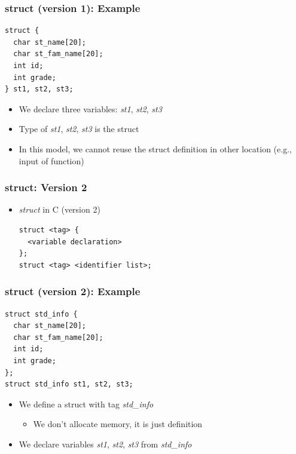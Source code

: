 \documentclass{../c-lecture}
\begin{document}
\begin{frame}[fragile]
  \frametitle{struct (version 1): Example}
  \begin{verbatim}
struct {
  char st_name[20];
  char st_fam_name[20];
  int id;
  int grade;
} st1, st2, st3;
  \end{verbatim}
  \begin{itemize}
    \item
      We declare three variables: \textit{\color{YellowOrange} st1},
      \textit{\color{YellowOrange} st2},
      \textit{\color{YellowOrange} st3}
    \item
      Type of \textit{\color{YellowOrange}st1},
      \textit{\color{YellowOrange} st2}, \textit{\color{YellowOrange} st3} is
      the struct
    \item
      In this model, we cannot reuse the struct definition in other location
      (e.g., input of function)
  \end{itemize}
\end{frame}

\begin{frame}[fragile]
  \frametitle{struct: Version 2}
  \begin{itemize}
    \item \textit{\color{Cyan} struct} in C (version 2)
    \begin{verbatim}
struct <tag> {
  <variable declaration>
};
struct <tag> <identifier list>;
    \end{verbatim}
  \end{itemize}
\end{frame}

\begin{frame}[fragile]
  \frametitle{struct (version 2): Example}
  \begin{verbatim}
struct std_info {
  char st_name[20];
  char st_fam_name[20];
  int id;
  int grade;
};
struct std_info st1, st2, st3;
  \end{verbatim}
  \begin{itemize}
    \item We define a struct with tag \textit{\color{YellowOrange} std\_info}
    \begin{itemize}
      \item We don’t allocate memory, it is just definition
    \end{itemize}
    \item
      We declare variables \textit{\color{LimeGreen} st1},
      \textit{\color{LimeGreen} st2}, \textit{\color{LimeGreen}st3} from
      \textit{\color{YellowOrange} std\_info}
  \end{itemize}
\end{frame}
\end{document}
